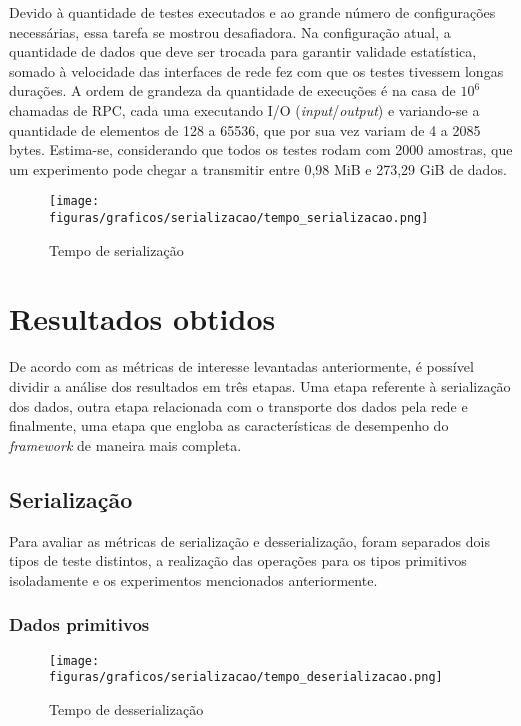 Devido à quantidade de testes executados e ao grande número de configurações necessárias, essa tarefa se mostrou desafiadora. Na configuração atual, a quantidade de dados que deve ser trocada para garantir validade estatística, somado à velocidade das interfaces de rede fez com que os testes tivessem longas durações. A ordem de grandeza da quantidade de execuções é na casa de $10^6$ chamadas de RPC, cada uma executando I/O (\textit{input}/\textit{output}) e variando-se a quantidade de elementos de 128 a 65536, que por sua vez variam de 4 a 2085 bytes. Estima-se, considerando que todos os testes rodam com 2000 amostras, que um experimento pode chegar a transmitir entre 0,98 MiB e 273,29 GiB de dados.

\begin{figure}[ht]
    \centering
    \caption{Tempo de serialização}
    \texttt{[image: figuras/graficos/serializacao/tempo\_serializacao.png]} 
    \label{fig:tempo_serializacao}
\end{figure}

\section{Resultados obtidos}
\label{sec:resultados}

De acordo com as métricas de interesse levantadas anteriormente, é possível dividir a análise dos resultados em três etapas. Uma etapa referente à serialização dos dados, outra etapa relacionada com o transporte dos dados pela rede e finalmente, uma etapa que engloba as características de desempenho do \textit{framework} de maneira mais completa.

\subsection{Serialização}

Para avaliar as métricas de serialização e desserialização, foram separados dois tipos de teste distintos, a realização das operações para os tipos primitivos isoladamente e os experimentos mencionados anteriormente.

\subsubsection{Dados primitivos}

\begin{figure}[ht]
    \centering
    \caption{Tempo de desserialização}
    \texttt{[image: figuras/graficos/serializacao/tempo\_deserializacao.png]} 
    \label{fig:tempo_desserializacao}
\end{figure}

